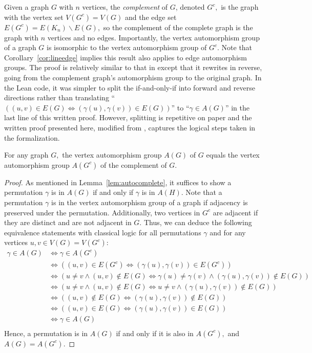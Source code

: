 \documentclass{article}
\begin{document}
Given a graph $G$ with $n$ vertices, the \textit{complement} of $G$, denoted $G^c,$ is the graph with the vertex set $V(G^c) = V(G)$ and the edge set $E(G^c) = E(K_n) \backslash E(G),$ so the complement of the complete graph is the graph with $n$ vertices and no edges. Importantly, the vertex  automorphism group of a graph $G$ is isomorphic to the vertex automorphism group of $G^c.$ Note that Corollary~\ref{cor:lineedge} implies this result also applies to edge automorphism groups. The proof is relatively similar to that in \cite{holton} except that it rewrites in reverse, going from the complement graph's automorphism group to the original graph. In the Lean code, it was simpler to split the if-and-only-if into forward and reverse directions rather than translating ``$((u,v) \in E(G) \iff (\gamma(u), \gamma(v)) \in E(G))$'' to ``$\gamma \in A(G)$'' in the last line of this written proof. However, splitting is repetitive on paper and the written proof presented here, modified from \cite{holton}, captures the logical steps taken in the formalization.
\begin{lemma}\label{lem:autoeq}
    For any graph $G,$ the vertex automorphism group $A(G)$ of $G$ equals the vertex automorphism group $A(G^c)$ of the complement of $G.$
\end{lemma}
\begin{proof}
    As mentioned in Lemma~\ref{lem:autocomplete}, it suffices to show a permutation $\gamma$ is in $A(G)$ if and only if $\gamma$ is in $A(H).$ Note that a permutation $\gamma$ is in the vertex automorphism group of a graph if adjacency is preserved under the permutation. Additionally, two vertices in $G^c$ are adjacent if they are distinct and are not adjacent in $G.$ Thus, we can deduce the following equivalence statements with classical logic for all permutations $\gamma$ and for any vertices $u, v \in V(G) = V(G^c):$
    \begin{align*}
        \gamma \in A(G) &\iff \gamma \in A(G^c)\\
        &\iff ((u,v) \in E(G^c) \iff (\gamma(u), \gamma(v)) \in E(G^c))\\
        &\iff (u \neq v \wedge (u,v) \notin E(G) \iff \gamma(u) \neq \gamma(v) \wedge (\gamma(u), \gamma(v)) \notin E(G))\\
        &\iff (u \neq v \wedge (u,v) \notin E(G) \iff u \neq v \wedge (\gamma(u), \gamma(v)) \notin E(G))\\
        &\iff ((u,v) \notin E(G) \iff (\gamma(u), \gamma(v)) \notin E(G))\\
        &\iff ((u,v) \in E(G) \iff (\gamma(u), \gamma(v)) \in E(G))\\
        &\iff \gamma \in A(G)\\
    \end{align*}
   Hence, a permutation is in $A(G)$ if and only if it is also in $A(G^c),$ and $A(G) = A(G^c).$
\end{proof}
\end{document}
